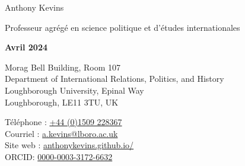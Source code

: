 \documentclass[letterpaper,fontsize=10.5pt]{scrartcl}
\begin{document}


\huge Anthony Kevins\\
\begin{minipage}[t]{.9\linewidth}
	\large Professeur agrégé en science politique et d'études internationales\\
\end{minipage}%
\begin{minipage}[t]{.1\linewidth}
	\raggedleft
	\scriptsize \textbf{Avril 2024}\\
\end{minipage}%
\normalsize

\hrulefill

\begin{minipage}[p]{.6\linewidth}
	\raggedright
	\medskip
	Morag Bell Building, Room 107\\
	Department of International Relations, Politics, and History\\
	Loughborough University, Epinal Way\\
	Loughborough, LE11 3TU, UK\\
	\medskip
\end{minipage}%
\begin{minipage}[p]{.4\linewidth}
	\raggedleft
	\medskip
	Téléphone : \href{tel:+4401509228367}{+44 (0)1509 228367}\\
	Courriel : \href{mailto:a.kevins@lboro.ac.uk}{a.kevins@lboro.ac.uk}\\
	Site web : \href{https://anthonykevins.github.io/fr/}{anthonykevins.github.io/}\\
	ORCID: \href{https://orcid.org/0000-0003-3172-6632}{0000-0003-3172-6632}\\
	\medskip
\end{minipage}%

\hrulefill

\end{document}
